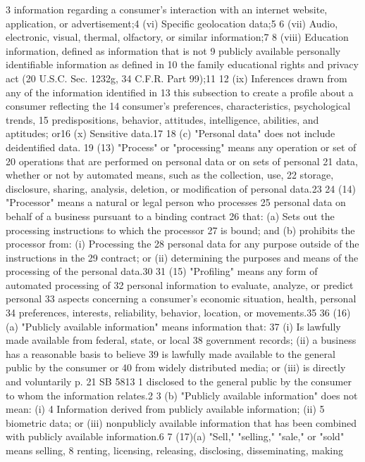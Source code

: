 3 information regarding a consumer's interaction with an internet
website, application, or advertisement;4
(vi) Specific geolocation data;5
6 (vii) Audio, electronic, visual, thermal, olfactory, or similar
information;7
8 (viii) Education information, defined as information that is not
9 publicly available personally identifiable information as defined in
10 the family educational rights and privacy act (20 U.S.C. Sec. 1232g,
34 C.F.R. Part 99);11
12 (ix) Inferences drawn from any of the information identified in
13 this subsection to create a profile about a consumer reflecting the
14 consumer's preferences, characteristics, psychological trends,
15 predispositions, behavior, attitudes, intelligence, abilities, and
aptitudes; or16
(x) Sensitive data.17
18 (c) "Personal data" does not include deidentified data.
19 (13) "Process" or "processing" means any operation or set of
20 operations that are performed on personal data or on sets of personal
21 data, whether or not by automated means, such as the collection, use,
22 storage, disclosure, sharing, analysis, deletion, or modification of
personal data.23
24 (14) "Processor" means a natural or legal person who processes
25 personal data on behalf of a business pursuant to a binding contract
26 that: (a) Sets out the processing instructions to which the processor
27 is bound; and (b) prohibits the processor from: (i) Processing the
28 personal data for any purpose outside of the instructions in the
29 contract; or (ii) determining the purposes and means of the
processing of the personal data.30
31 (15) "Profiling" means any form of automated processing of
32 personal information to evaluate, analyze, or predict personal
33 aspects concerning a consumer's economic situation, health, personal
34 preferences, interests, reliability, behavior, location, or
movements.35
36 (16)(a) "Publicly available information" means information that:
37 (i) Is lawfully made available from federal, state, or local
38 government records; (ii) a business has a reasonable basis to believe
39 is lawfully made available to the general public by the consumer or
40 from widely distributed media; or (iii) is directly and voluntarily
p. 21 SB 5813
1 disclosed to the general public by the consumer to whom the
information relates.2
3 (b) "Publicly available information" does not mean: (i)
4 Information derived from publicly available information; (ii)
5 biometric data; or (iii) nonpublicly available information that has
been combined with publicly available information.6
7 (17)(a) "Sell," "selling," "sale," or "sold" means selling,
8 renting, licensing, releasing, disclosing, disseminating, making
